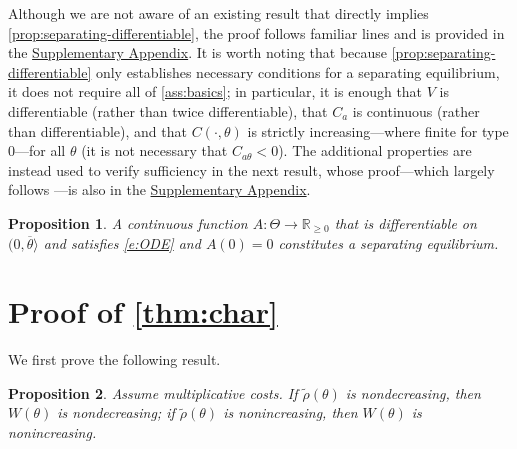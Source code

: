\documentclass[12 pt]{article}
\newtheorem{proposition}{Proposition}
\theoremstyle{remark}
\theoremstyle{definition}
\newcommand{\R}{\mathbb{R}}
\newcommand{\Rpos}{\R_{\geq0}}
\newcommand{\elaR}{\tilde\rho}    %
\newcommand{\suppapp}[1]{\hyperref[#1]{Supplementary Appendix}}
\begin{document}
Although we are not aware of an existing result that directly implies \autoref{prop:separating-differentiable}, the proof follows familiar lines \citep[cf.~][]{Mailath87} and is provided in the \suppapp{sec:proof:separating-differentiable}.  It is worth noting that because \autoref{prop:separating-differentiable} only establishes necessary conditions for a separating equilibrium, it does not require all of \autoref{ass:basics}; in particular, it is enough that $V$ is %
differentiable (rather than twice differentiable), %
that $C_a$ is continuous (rather than differentiable), and that $C(\cdot,\theta)$ is strictly increasing---where finite for type $0$---for all $\theta$ (it is not necessary that $C_{a\theta}<0$). The additional properties are instead used to verify sufficiency in the next result, whose proof---which largely follows \citet{Mailath87}---is also in the \suppapp{sec:proof:separating-differentiable}.

\begin{proposition}
\label{prop:sufficiency}
A continuous function $A: \Theta \to \Rpos$ that is differentiable on $(0,\overline \theta\rangle $ and satisfies \eqref{e:ODE} and $A(0)=0$ constitutes a separating equilibrium.
\end{proposition}


\section{Proof of \autoref{thm:char}}
\label{sec:charproof}

We first prove the following result.


\begin{proposition}
\label{prop:waste_monotone}
Assume multiplicative costs. If $\elaR(\theta)$ is nondecreasing, then $W(\theta)$ is nondecreasing; if $\elaR(\theta)$ is nonincreasing, then $W(\theta)$ is nonincreasing.
\end{proposition}
\end{document}

